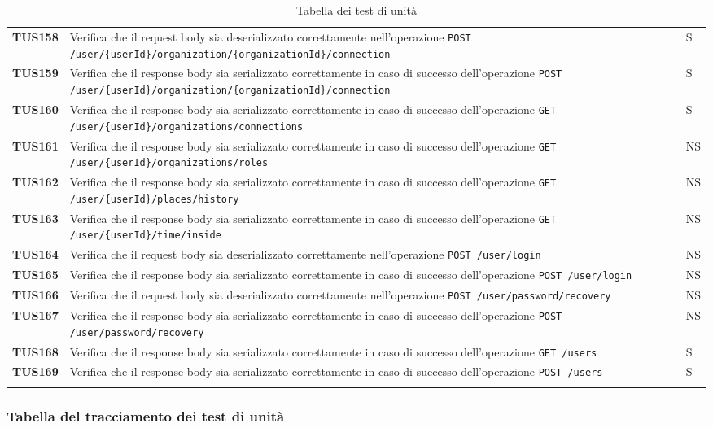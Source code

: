 \documentclass[../../piano-di-qualifica.tex]{subfiles}
\begin{document}
\begin{longtable}[H]{>{\centering\bfseries}m{3cm} >{}m{10cm} >{\centering\arraybackslash}m{3cm}}
  TUS158 & Verifica che il request body sia deserializzato correttamente nell'operazione \verb|POST /user/{userId}/organization/{organizationId}/connection| & S \\
  TUS159 & Verifica che il response body sia serializzato correttamente in caso di successo dell'operazione \verb|POST /user/{userId}/organization/{organizationId}/connection| & S \\
  TUS160 & Verifica che il response body sia serializzato correttamente in caso di successo dell'operazione \verb|GET /user/{userId}/organizations/connections| & S \\
  TUS161 & Verifica che il response body sia serializzato correttamente in caso di successo dell'operazione \verb|GET /user/{userId}/organizations/roles| & NS \\
  TUS162 & Verifica che il response body sia serializzato correttamente in caso di successo dell'operazione \verb|GET /user/{userId}/places/history| & NS \\
  TUS163 & Verifica che il response body sia serializzato correttamente in caso di successo dell'operazione \verb|GET /user/{userId}/time/inside| & NS \\
  TUS164 & Verifica che il request body sia deserializzato correttamente nell'operazione \verb|POST /user/login| & NS \\
  TUS165 & Verifica che il response body sia serializzato correttamente in caso di successo dell'operazione \verb|POST /user/login| & NS \\
  TUS166 & Verifica che il request body sia deserializzato correttamente nell'operazione \verb|POST /user/password/recovery| & NS \\
  TUS167 & Verifica che il response body sia serializzato correttamente in caso di successo dell'operazione \verb|POST /user/password/recovery| & NS \\
  TUS168 & Verifica che il response body sia serializzato correttamente in caso di successo dell'operazione \verb|GET /users| & S \\
  TUS169 & Verifica che il response body sia serializzato correttamente in caso di successo dell'operazione \verb|POST /users| & S \\

  \rowcolor{white}
  \caption{Tabella dei test di unità}%
  \label{tab:test_di_unita}
\end{longtable}


\subsubsection{Tabella del tracciamento dei test di unità}%
\label{subsub:tabella_tracciamento_test_di_unita}
\end{document}
